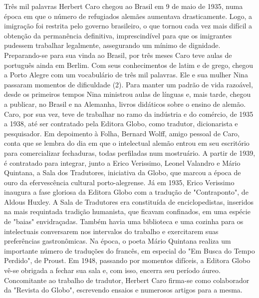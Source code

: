 Três mil palavras 
Herbert Caro chegou ao Brasil em 9 de maio de 1935, numa época em que o número de refugiados alemães aumentava drasticamente. Logo, a imigração foi restrita pelo governo brasileiro, o que tornou cada vez mais difícil a obtenção da permanência definitiva, imprescindível para que os imigrantes pudessem trabalhar legalmente, assegurando um mínimo de dignidade.
Preparando-se para sua vinda ao Brasil, por três meses Caro teve aulas de português ainda em Berlim. Com seus conhecimentos de latim e de grego, chegou a Porto Alegre com um vocabulário de três mil palavras.
Ele e sua mulher Nina passaram momentos de dificuldade (2). Para manter um padrão de vida razoável, desde os primeiros tempos Nina ministrou aulas de línguas e, mais tarde, chegou a publicar, no Brasil e na Alemanha, livros didáticos sobre o ensino de alemão. Caro, por sua vez, teve de trabalhar no ramo da indústria e do comércio, de 1935 a 1938, até ser contratado pela Editora Globo, como tradutor, dicionarista e pesquisador. Em depoimento à Folha, Bernard Wolff, amigo pessoal de Caro, conta que se lembra do dia em que o intelectual alemão entrou em seu escritório para comercializar fechaduras, todas perfiladas num mostruário.
A partir de 1939, é contratado para integrar, junto a Erico Verissimo, Leonel Valandro e Mário Quintana, a Sala dos Tradutores, iniciativa da Globo, que marcou a época de ouro da efervescência cultural porto-alegrense. Já em 1935, Erico Verissimo inaugura a fase gloriosa da Editora Globo com a tradução de "Contraponto", de Aldous Huxley.
A Sala de Tradutores era constituída de enciclopedistas, inseridos na mais requintada tradição humanista, que ficavam confinados, em uma espécie de "baias" envidraçadas. Também havia uma biblioteca e uma cozinha para os intelectuais conversarem nos intervalos do trabalho e exercitarem suas preferências gastronômicas.
Na época, o poeta Mário Quintana realiza um importante número de traduções do francês, em especial do "Em Busca do Tempo Perdido", de Proust. Em 1948, passando por momentos difíceis, a Editora Globo vê-se obrigada a fechar sua sala e, com isso, encerra seu período áureo.
Concomitante ao trabalho de tradutor, Herbert Caro firma-se como colaborador da "Revista do Globo", escrevendo ensaios e numerosos artigos para a mesma.

